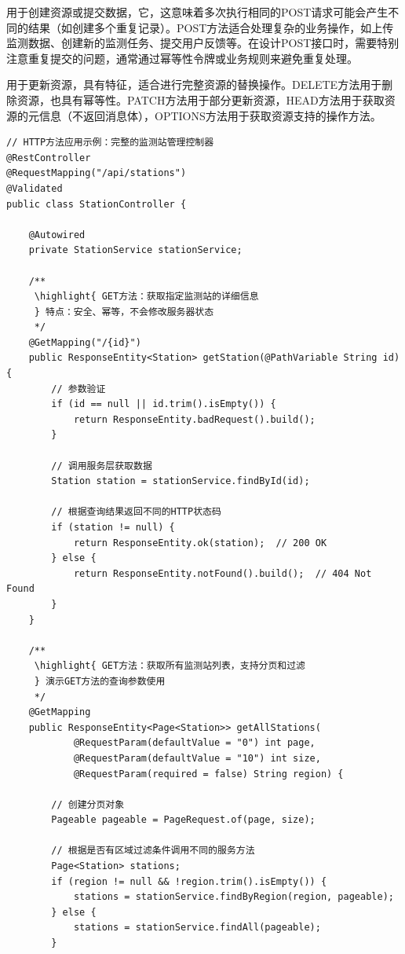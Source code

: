 用于创建资源或提交数据，它，这意味着多次执行相同的POST请求可能会产生不同的结果（如创建多个重复记录）。POST方法适合处理复杂的业务操作，如上传监测数据、创建新的监测任务、提交用户反馈等。在设计POST接口时，需要特别注意重复提交的问题，通常通过幂等性令牌或业务规则来避免重复处理。

用于更新资源，具有特征，适合进行完整资源的替换操作。DELETE方法用于删除资源，也具有幂等性。PATCH方法用于部分更新资源，HEAD方法用于获取资源的元信息（不返回消息体），OPTIONS方法用于获取资源支持的操作方法。

\begin{lstlisting}[style=java]
// HTTP方法应用示例：完整的监测站管理控制器
@RestController
@RequestMapping("/api/stations")
@Validated
public class StationController {
    
    @Autowired
    private StationService stationService;
    
    /**
     \highlight{ GET方法：获取指定监测站的详细信息
     } 特点：安全、幂等，不会修改服务器状态
     */
    @GetMapping("/{id}")
    public ResponseEntity<Station> getStation(@PathVariable String id) {
        // 参数验证
        if (id == null || id.trim().isEmpty()) {
            return ResponseEntity.badRequest().build();
        }
        
        // 调用服务层获取数据
        Station station = stationService.findById(id);
        
        // 根据查询结果返回不同的HTTP状态码
        if (station != null) {
            return ResponseEntity.ok(station);  // 200 OK
        } else {
            return ResponseEntity.notFound().build();  // 404 Not Found
        }
    }
    
    /**
     \highlight{ GET方法：获取所有监测站列表，支持分页和过滤
     } 演示GET方法的查询参数使用
     */
    @GetMapping
    public ResponseEntity<Page<Station>> getAllStations(
            @RequestParam(defaultValue = "0") int page,
            @RequestParam(defaultValue = "10") int size,
            @RequestParam(required = false) String region) {
        
        // 创建分页对象
        Pageable pageable = PageRequest.of(page, size);
        
        // 根据是否有区域过滤条件调用不同的服务方法
        Page<Station> stations;
        if (region != null && !region.trim().isEmpty()) {
            stations = stationService.findByRegion(region, pageable);
        } else {
            stations = stationService.findAll(pageable);
        }
        

\end{lstlisting}
